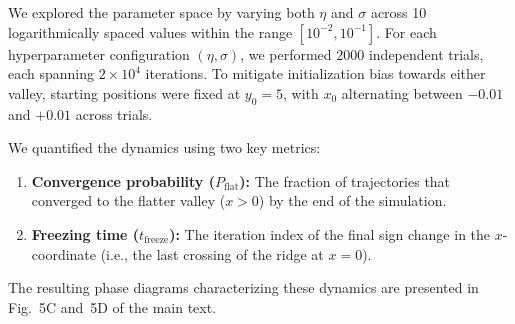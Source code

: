 \documentclass[aps,prx,preprint,superscriptaddress,nofootinbib]{revtex4-2}
\begin{document}
We explored the parameter space by varying both $\eta$ and $\sigma$ across 10 logarithmically spaced values within the range $[10^{-2}, 10^{-1}]$. For each hyperparameter configuration $(\eta, \sigma)$, we performed $2000$ independent trials, each spanning $2\times10^4$ iterations. To mitigate initialization bias towards either valley, starting positions were fixed at $y_0 = 5$, with $x_0$ alternating between $-0.01$ and $+0.01$ across trials.

We quantified the dynamics using two key metrics:
\begin{enumerate}
    \item \textbf{Convergence probability ($P_\mathrm{flat}$):} The fraction of trajectories that converged to the flatter valley ($x > 0$) by the end of the simulation.
    \item \textbf{Freezing time ($t_\mathrm{freeze}$):} The iteration index of the final sign change in the $x$-coordinate (i.e., the last crossing of the ridge at $x=0$).
\end{enumerate}
The resulting phase diagrams characterizing these dynamics are presented in Fig.~5C and~5D of the main text.



\end{document}
